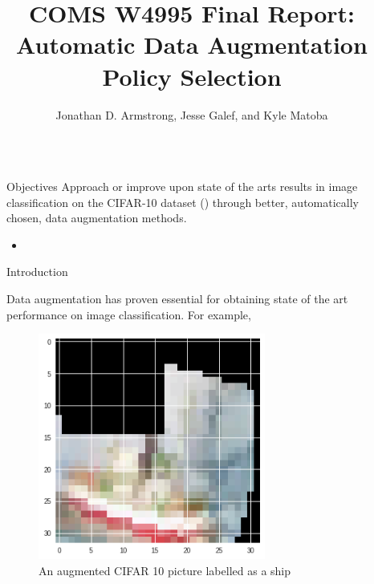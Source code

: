 \documentclass[final]{beamer}
\title{COMS W4995 Final Report: Automatic Data Augmentation Policy Selection} %
\author{Jonathan D. Armstrong, Jesse Galef, and Kyle Matoba} %
\institute{Computer Science Department, Columbia University} %
\newlength{\sepwid}
\newlength{\onecolwid}
\begin{document}

\setlength{\belowcaptionskip}{2ex} %
\setlength\belowdisplayshortskip{2ex} %

\begin{frame}[t] %
\begin{columns}[t] %

\begin{column}{\sepwid}\end{column} %
\begin{column}{\onecolwid} %

\begin{alertblock}{Objectives}
Approach or improve upon state of the arts results in image classification on the CIFAR-10 dataset (\cite{Krizhevsky2009}) through better, automatically chosen, data augmentation methods. 
\begin{itemize}
\item \cite{Cubuk2018}
\end{itemize}
\end{alertblock}


\begin{block}{Introduction}

Data augmentation has proven essential for obtaining state of the art performance on image classification. For example, 

\cite{Recht2018}


\begin{figure}
\centering
\includegraphics[width=0.70\textwidth]{ship.png}
\caption{An augmented CIFAR 10 picture labelled as a ship}
\end{figure}
\end{block}
\end{column} %


\end{columns}
\end{frame}
\end{document}
